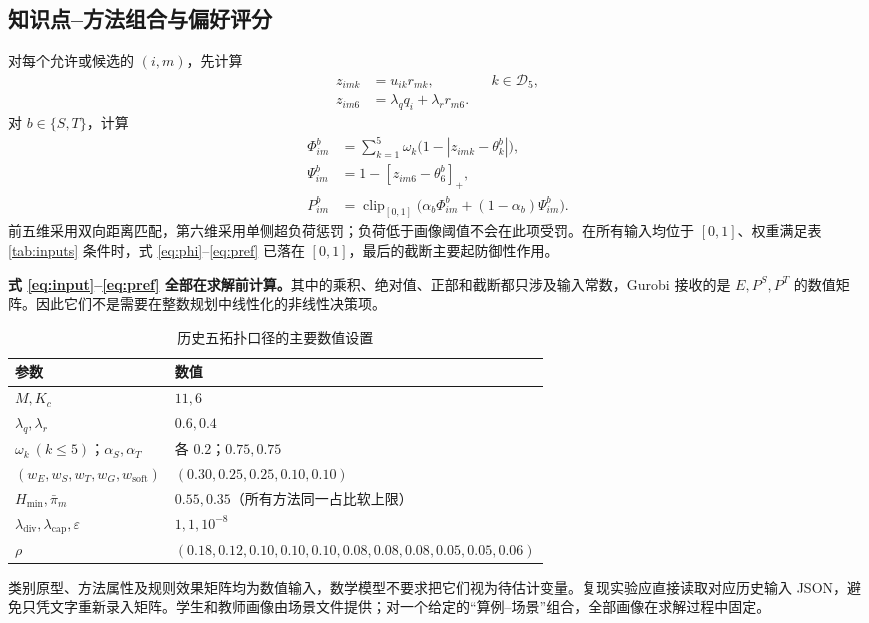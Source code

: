 \documentclass[UTF8,11pt,a4paper,fontset=fandol]{ctexart}
\newcommand{\clip}{\operatorname{clip}_{[0,1]}}
\begin{document}
\subsection{知识点--方法组合与偏好评分}
对每个允许或候选的 $(i,m)$，先计算
\begin{align}
 z_{imk}&=u_{ik}r_{mk},&&k\in\mathcal D_5,\label{eq:z5}\\
 z_{im6}&=\lambda_q q_i+\lambda_r r_{m6}.\label{eq:z6}
\end{align}
对 $b\in\{S,T\}$，计算
\begin{align}
 \Phi^b_{im}&=\sum_{k=1}^{5}\omega_k\bigl(1-|z_{imk}-\theta^b_k|\bigr),\label{eq:phi}\\
 \Psi^b_{im}&=1-[z_{im6}-\theta^b_6]_+,\label{eq:psi}\\
 P^b_{im}&=\clip\bigl(\alpha_b\Phi^b_{im}+(1-\alpha_b)\Psi^b_{im}\bigr).\label{eq:pref}
\end{align}
前五维采用双向距离匹配，第六维采用单侧超负荷惩罚；负荷低于画像阈值不会在此项受罚。在所有输入均位于 $[0,1]$、权重满足表 \ref{tab:inputs} 条件时，式 \eqref{eq:phi}--\eqref{eq:pref} 已落在 $[0,1]$，最后的截断主要起防御性作用。

\textbf{式 \eqref{eq:input}--\eqref{eq:pref} 全部在求解前计算。}其中的乘积、绝对值、正部和截断都只涉及输入常数，Gurobi 接收的是 $E,P^S,P^T$ 的数值矩阵。因此它们不是需要在整数规划中线性化的非线性决策项。

\begin{table}[htbp]
\centering\small
\caption{历史五拓扑口径的主要数值设置}\label{tab:parameters}
\begin{tabularx}{\textwidth}{p{}X}
\toprule 参数 & 数值 \\ \midrule
$M,K_c$ & $11,6$ \\
$\lambda_q,\lambda_r$ & $0.6,0.4$ \\
$\omega_k\ (k\le5)$；$\alpha_S,\alpha_T$ & 各 $0.2$；$0.75,0.75$ \\
$(w_E,w_S,w_T,w_G,w_{\mathrm{soft}})$ & $(0.30,0.25,0.25,0.10,0.10)$ \\
$H_{\min},\bar\pi_m$ & $0.55,0.35$（所有方法同一占比软上限） \\
$\lambda_{\mathrm{div}},\lambda_{\mathrm{cap}},\varepsilon$ & $1,1,10^{-8}$ \\
$\rho$ & $(0.18,0.12,0.10,0.10,0.10,0.08,0.08,0.08,0.05,0.05,0.06)$ \\
\bottomrule
\end{tabularx}
\end{table}
类别原型、方法属性及规则效果矩阵均为数值输入，数学模型不要求把它们视为待估计变量。复现实验应直接读取对应历史输入 JSON，避免只凭文字重新录入矩阵。学生和教师画像由场景文件提供；对一个给定的“算例--场景”组合，全部画像在求解过程中固定。
\end{document}
